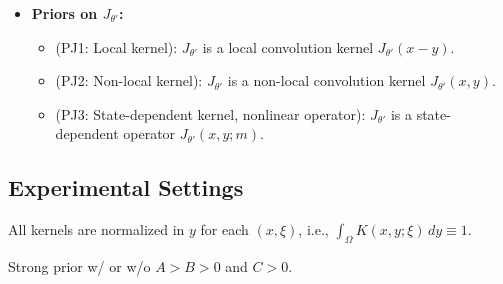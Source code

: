 \documentclass[11pt,a4paper]{article}
\theoremstyle{plain}
\theoremstyle{definition}
\theoremstyle{remark}
\begin{document}
\begin{itemize}
	\item \textbf{Priors on $J_{\theta\prime}$:}
	      \begin{itemize}
		      \item (PJ1: Local kernel): $J_{\theta\prime}$ is a local convolution kernel $J_{\theta\prime}(x-y)$.
		      \item (PJ2: Non-local kernel): $J_{\theta\prime}$ is a non-local convolution kernel $J_{\theta\prime}(x,y)$.
		      \item (PJ3: State-dependent kernel, nonlinear operator): $J_{\theta\prime}$ is a state-dependent operator $J_{\theta\prime}(x,y; m)$.
	      \end{itemize}
\end{itemize}








\subsection{Experimental Settings}

All kernels are normalized in $y$ for each $(x,\xi)$, i.e., $\int_{\Omega}K(x,y;\xi)\,dy\equiv1$.


\noindent
Strong prior w/ or w/o $A>B>0$ and $C>0$.
\end{document}
